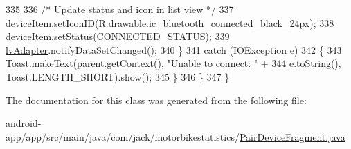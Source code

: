 \begin{DoxyCode}
335 
336                     \textcolor{comment}{/* Update status and icon in list view */}
337                     deviceItem.\hyperlink{classcom_1_1jack_1_1motorbikestatistics_1_1_b_t_device_item_a40eb2a1f46700690d2327bf37bc5ed0e}{setIconID}(R.drawable.ic\_bluetooth\_connected\_black\_24px);
338                     deviceItem.setStatus(\hyperlink{classcom_1_1jack_1_1motorbikestatistics_1_1_pair_device_fragment_a99e2ea55ac395622e937982582b2a6bf}{CONNECTED\_STATUS});
339                     \hyperlink{classcom_1_1jack_1_1motorbikestatistics_1_1_pair_device_fragment_a5ab5efcda2c2fe8db4420ec28ea2840f}{lvAdapter}.notifyDataSetChanged();
340                 \}
341                 \textcolor{keywordflow}{catch} (IOException e)
342                 \{
343                     Toast.makeText(parent.getContext(), \textcolor{stringliteral}{"Unable to connect: "} +
344                             e.toString(), Toast.LENGTH\_SHORT).show();
345                 \}
346             \}
347         \}
\end{DoxyCode}


The documentation for this class was generated from the following file\+:\begin{DoxyCompactItemize}
\item 
android-\/app/app/src/main/java/com/jack/motorbikestatistics/\hyperlink{_pair_device_fragment_8java}{Pair\+Device\+Fragment.\+java}\end{DoxyCompactItemize}
